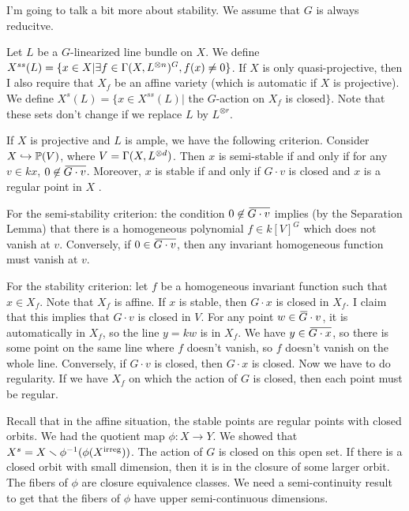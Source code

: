 
I'm going to talk a bit more about stability. We assume that $G$ is always reducitve.

Let $L$ be a $G$-linearized line bundle on $X$. We define $X^{ss}(L)=\{x\in X| \exists f\in \Gamma(X,L^{\otimes n})^G, f(x)\neq 0\}$. If $X$ is only quasi-projective, then I also require that $X_f$ be an affine variety (which is automatic if $X$ is projective). We define $X^s(L)=\{x\in X^{ss}(L)|$ the $G$-action on $X_f$ is closed$\}$. Note that these sets don't change if we replace $L$ by $L^{\otimes r}$.

If $X$ is projective and $L$ is ample, we have the following criterion. Consider $X\hookrightarrow \mathbb{P}(V)$, where $V=\Gamma(X,L^{\otimes d})$. Then $x$ is semi-stable if and only if for any $v\in kx$, $0\not\in\bbar{G\cdot v}$. Moreover, $x$ is stable if and only if $G\cdot v$ is closed and $x$ is a regular point in $X$ .

For the semi-stability criterion: the condition $0\not\in \bbar{G\cdot v}$ implies (by the Separation Lemma) that there is a homogeneous polynomial $f\in k[V]^G$ which does not vanish at $v$. Conversely, if $0\in\bbar{G\cdot v}$, then any invariant homogeneous function must vanish at $v$.

For the stability criterion: let $f$ be a homogeneous invariant function such that $x\in X_f$. Note that $X_f$ is affine. If $x$ is stable, then $G\cdot x$ is closed in $X_f$. I claim that this implies that $G\cdot v$ is closed in $V$. For any point $w\in \bbar G\cdot v$, it is automatically in $X_f$, so the line $y=kw$ is in $X_f$. We have $y\in \bbar{G\cdot x}$, so there is some point on the same line where $f$ doesn't vanish, so $f$ doesn't vanish on the whole line. Conversely, if $G\cdot v$ is closed, then $G\cdot x$ is closed. Now we have to do regularity. If we have $X_f$ on which the action of $G$ is closed, then each point must be regular.

Recall that in the affine situation, the stable points are regular points with closed orbits. We had the quotient map $\phi\colon X\to Y$. We showed that $X^s=X\smallsetminus \phi^{-1}(\phi(X^{\mathrm{irreg}}))$. The action of $G$ is closed on this open set. If there is a closed orbit with small dimension, then it is in the closure of some larger orbit. The fibers of $\phi$ are closure equivalence classes. We need a semi-continuity result to get that the fibers of $\phi$ have upper semi-continuous dimensions.

